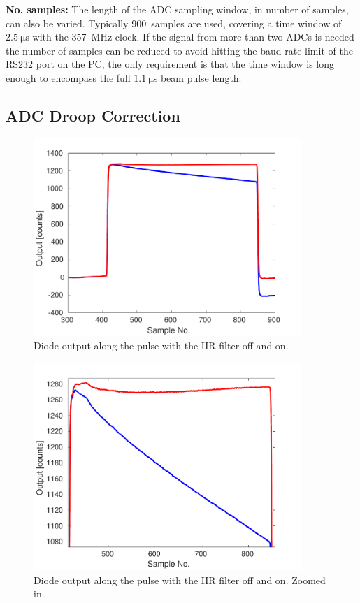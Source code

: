 \textbf{No. samples:} The length of the ADC sampling window, in number of samples, can also be varied. Typically 900~samples are used, covering a time window of \(2.5~\mathrm{\mu}\)s with the 357~MHz clock. If the signal from more than two ADCs is needed the number of samples can be reduced to avoid hitting the baud rate limit of the RS232 port on the PC, the only requirement is that the time window is long enough to encompass the full \(1.1~\mathrm{\mu}\)s beam pulse length.


\subsection{ADC Droop Correction}
\label{ss:droopCorr}

\begin{figure}
  \centering
  \includegraphics[width=0.9\textwidth]{Figures/commissioning/iirDiodeFiltOffOn}
  \caption{Diode output along the pulse with the IIR filter off and on.}
  \label{f:iirDiodefiltOffOn}
\end{figure}

\begin{figure}
  \centering
  \includegraphics[width=0.9\textwidth]{Figures/commissioning/iirDiodeFiltOffOn_zoom}
  \caption{Diode output along the pulse with the IIR filter off and on. Zoomed in.}
  \label{f:iirDiodefiltOffOn_zoom}
\end{figure}

